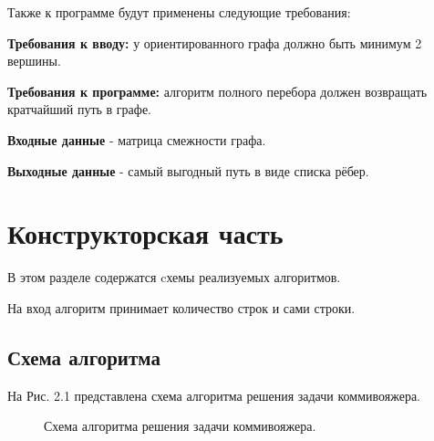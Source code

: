 \documentclass[12pt]{report}
\begin{document}
Также к программе будут применены следующие требования: 

{\bf Требования к вводу:} у ориентированного графа должно быть минимум 2 вершины.

{\bf Требования к программе: }алгоритм полного перебора должен возвращать кратчайший путь в графе.

\textbf{Входные данные} - матрица смежности графа.  

\textbf{Выходные данные} - самый выгодный путь в виде списка рёбер.

\clearpage

\chapter{Конструкторская часть}
В этом разделе содержатся cхемы реализуемых алгоритмов.

На вход алгоритм принимает количество строк и сами строки.
	
\section{Схема алгоритма}
На Рис. 2.1 представлена схема алгоритма решения задачи коммивояжера.

\vspace{\baselineskip}

\begin{figure}[h]
	\caption{Схема алгоритма решения задачи коммивояжера.}
	\label{figure:image}
\end{figure}
\end{document}
